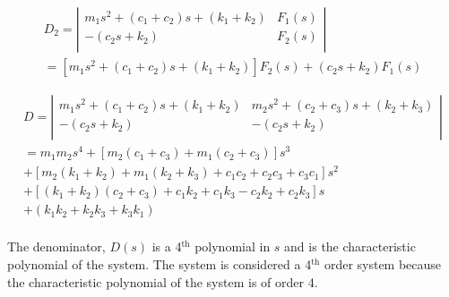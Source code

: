 \documentclass[12pt,letter]{article}
\begin{document}
	\begin{eqnarray}
	D_2 = \left|
	\begin{array}{cc}
	m_1 s^2 + (c_1 + c_2)s + (k_1+k_2)  & F_1(s) \\
	-(c_2s+k_2)  & F_2(s) \\
	\end{array}
	\right| \\
	= [m_1 s^2 + (c_1 + c_2)s + (k_1+k_2)]F_2(s) + (c_2s+k_2)F_1(s)  \nonumber
	\end{eqnarray}
	
	\begin{eqnarray}
	D = \left|
	\begin{array}{cc}
	m_1 s^2 + (c_1 + c_2)s + (k_1+k_2) & m_2 s^2 + (c_2 + c_3)s + (k_2+k_3) \\
	-(c_2s+k_2) & -(c_2s+k_2) \\
	\end{array}
	\right| \\ \nonumber
	= m_1m_2s^4 + [m_2(c_1+c_3)+m_1(c_2+c_3)]s^3 \\  \nonumber
	+ [m_2(k_1+k_2)+m_1(k_2+k_3)+c_1c_2+c_2c_3+c_3c_1]s^2 \\  \nonumber
	+ [(k_1+k_2)(c_2+c_3)+c_1k_2+c_1k_3-c_2k_2+c_2k_3]s \\  \nonumber
	+ (k_1k_2 + k_2k_3 + k_3k_1) \\  \nonumber
	\end{eqnarray}
	
	The denominator, $D(s)$ is a 4$^{\text{th}}$ polynomial in $s$ and is the characteristic polynomial of the system. The system is considered a 4$^{\text{th}}$ order system because the characteristic polynomial of the system is of order 4. 
	

	
	
\end{document}
